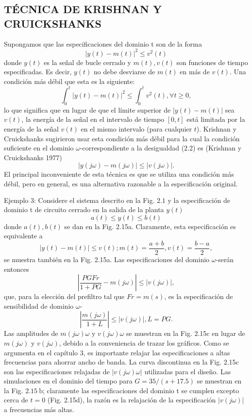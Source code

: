 \subsection{TÉCNICA DE KRISHNAN Y CRUICKSHANKS}
Supongamos que las especificaciones del dominio t son de la forma
$$
|y(t)-m(t)|^{2} \leq v^{2}(t)
$$
donde $y(t)$ es la señal de bucle cerrado y $m(t), v(t)$ son funciones de tiempo especificadas. Es decir, $y(t)$ no debe desviarse de $m(t)$ en más de $v(t)$. Una condición más débil que esta es la siguiente:
$$
\int_{0}^{t}|y(t)-m(t)|^{2} \leq \int_{0}^{t} v^{2}(t), \forall t \geq 0,
$$
lo que significa que en lugar de que el límite superior de $|y(t)-m(t)|$ sea $v(t)$, la energía de la señal en el intervalo de tiempo $[0, t]$ está limitada por la energía de la señal $v(t)$ en el mismo intervalo (para cualquier $t$). Krishnan y Cruickshanks sugirieron usar esta condición más débil para la cual la condición suficiente en el dominio $\omega$-correspondiente a la desigualdad (2.2) es (Krishnan y Cruickshanks 1977)
$$
|y(j \omega)-m(j \omega)| \leq|v(j \omega)| .
$$
El principal inconveniente de esta técnica es que se utiliza una condición más débil, pero en general, es una alternativa razonable a la especificación original.

Ejemplo 3: Considere el sistema descrito en la Fig. $2.1$ y la especificación de dominio t de circuito cerrado en la salida de la planta $y(t)$
$$
a(t) \leq y(t) \leq b(t)
$$
donde $a(t), b(t)$ se dan en la Fig. 2.15a. Claramente, esta especificación es equivalente a
$$
|y(t)-m(t)| \leq v(t) ; m(t)=\frac{a+b}{2}, v(t)=\frac{b-a}{2},
$$
se muestra también en la Fig. 2.15a. Las especificaciones del dominio $\omega$-serán entonces
$$
\left|\frac{P G F r}{1+P G}-m(j \omega)\right| \leq|v(j \omega)|,
$$
que, para la elección del prefiltro tal que $F r=m(s)$, es la especificación de sensibilidad de dominio $\omega$-
$$
\left|\frac{m(j \omega)}{1+L}\right| \leq|v(j \omega)|, L=P G .
$$
Las amplitudes de $m(j \omega) \omega$ y $v(j \omega) \omega$ se muestran en la Fig. 2.15c en lugar de $m(j \omega)$ y $v(j \omega)$, debido a la conveniencia de trazar los gráficos. Como se argumenta en el capítulo 3, es importante relajar las especificaciones a altas frecuencias para ahorrar ancho de banda. La curva discontinua en la Fig. 2.15c son las especificaciones relajadas de $|v(j \omega) \omega|$ utilizadas para el diseño. Las simulaciones en el dominio del tiempo para $G=35 /(s+17.5)$ se muestran en la Fig. $2.15 \mathrm{~b}$; claramente las especificaciones del dominio t se cumplen excepto cerca de $t=0$ (Fig. 2.15d), la razón es la relajación de la especificación $|v(j \omega)|$ a frecuencias más altas.

